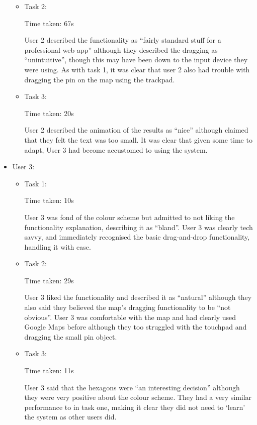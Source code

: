 \documentclass[10pt,a4paper]{article}
\begin{document}
\begin{itemize}
{\begin{itemize}
{User 2 described the gradient background of the pinboard as “word art-y”, although they liked the professional look of the banner across the top of the page.
It was clear that user 2 struggled with the dragging and was not comfortable using a touchpad rather than a mouse to perform the task, which raised issues we had not considered.
}
\item{Task 2:

Time taken: 67s

User 2 described the functionality as “fairly standard stuff for a professional web-app” although they described the dragging as “unintuitive”, though this may have been down to the input device they were using. 
As with task 1, it was clear that user 2 also had trouble with dragging the pin on the map using the trackpad.}
\item{Task 3:

Time taken: 20s

User 2 described the animation of the results as “nice” although claimed that they felt the text was too small.
It was clear that given some time to adapt, User 3 had become accustomed to using the system.
}
\end{itemize}}

\item{User 3:
\begin{itemize}
\item{Task 1:

Time taken: 10s

User 3 was fond of the colour scheme but admitted to not liking the functionality explanation, describing it as “bland”.
User 3 was clearly tech savvy, and immediately recognised the basic drag-and-drop functionality, handling it with ease.
}
\item{Task 2:

Time taken: 29s

User 3 liked the functionality and described it as “natural” although they also said they believed the map’s dragging functionality to be “not obvious”.
User 3 was comfortable with the map and had clearly used Google Maps before although they too struggled with the touchpad and dragging the small pin object.
}
\item{Task 3:

Time taken: 11s

User 3 said that the hexagons were “an interesting decision” although they were very positive about the colour scheme.
They had a very similar performance to in task one, making it clear they did not need to ‘learn’ the system as other users did.
}
\end{itemize}}

\end{itemize}
\end{document}
